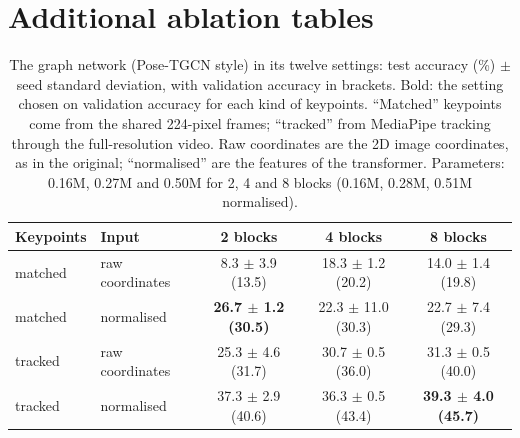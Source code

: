 \documentclass{article}
\begin{document}



\appendix
\section{Additional ablation tables}

\begin{table}[h]
\centering\footnotesize\setlength{\tabcolsep}{2.5pt}
\begin{tabular}{llccc}
\toprule
Keypoints & Input & 2 blocks & 4 blocks & 8 blocks \\
\midrule
matched  & raw coordinates & 8.3 $\pm$ 3.9 (13.5)  & 18.3 $\pm$ 1.2 (20.2) & 14.0 $\pm$ 1.4 (19.8) \\
matched  & normalised      & \textbf{26.7 $\pm$ 1.2 (30.5)} & 22.3 $\pm$ 11.0 (30.3) & 22.7 $\pm$ 7.4 (29.3) \\
tracked  & raw coordinates & 25.3 $\pm$ 4.6 (31.7) & 30.7 $\pm$ 0.5 (36.0) & 31.3 $\pm$ 0.5 (40.0) \\
tracked  & normalised      & 37.3 $\pm$ 2.9 (40.6) & 36.3 $\pm$ 0.5 (43.4) & \textbf{39.3 $\pm$ 4.0 (45.7)} \\
\bottomrule
\end{tabular}
\caption{The graph network (Pose-TGCN style) in its twelve settings: test accuracy (\%) $\pm$ seed standard deviation, with
validation accuracy in brackets. Bold: the setting chosen on validation accuracy for each kind of keypoints. ``Matched''
keypoints come from the shared 224-pixel frames; ``tracked'' from MediaPipe tracking through the full-resolution video. Raw
coordinates are the 2D image coordinates, as in the original; ``normalised'' are the features of the transformer. Parameters:
0.16M, 0.27M and 0.50M for 2, 4 and 8 blocks (0.16M, 0.28M, 0.51M normalised).}
\label{tab:graph}
\end{table}
\end{document}

